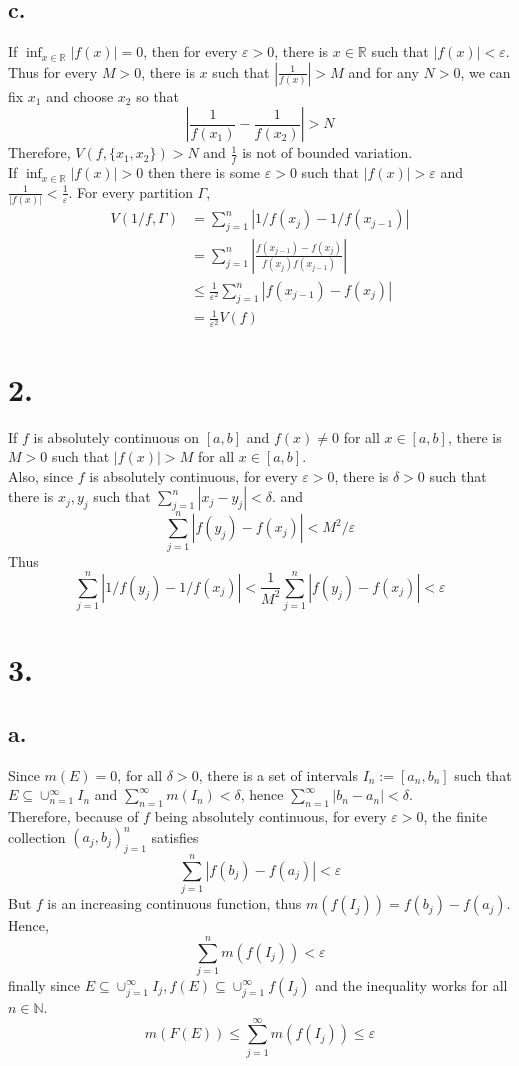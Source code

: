 \documentclass[11pt]{article}
\theoremstyle{mystyle}
\theoremstyle{definition}
\begin{document}
\subsection*{c.}
If $\inf_{x \in \mathbb{R}} |f(x)| = 0$, then for every $\varepsilon > 0$, there is $x \in \mathbb{R}$ such that $|f(x)| < \varepsilon$.  Thus for every $M > 0$, there is $x$ such that $|\frac{1}{f(x)}| > M $ and for any $N > 0$, we can fix $x_1$ and choose $x_2$ so that 
\[
  \left|\displaystyle\frac{1}{f(x_1)} - \displaystyle\frac{1}{f(x_2)}\right| > N  
\]
Therefore, $V(f, \{x_1, x_2\}) > N$ and $\displaystyle\frac{1}{f}$ is not of bounded variation. \\
If $\inf_{x \in \mathbb{R}} |f(x)| > 0$ then there is some $\varepsilon > 0$ such that $|f(x)| > \varepsilon$ and $\displaystyle\frac{1}{|f(x)|} < \displaystyle\frac{1}{\varepsilon}$. For every partition $\Gamma$,  
\begin{align*}
  V(1/f, \Gamma) &= \sum_{j=1}^n |1/f(x_j) - 1/f(x_{j-1}) | \\
  &= \sum_{j=1}^n \left| \displaystyle\frac{f(x_{j-1}) - f(x_j)}{f(x_j)f(x_{j-1})} \right| \\
  &\le \displaystyle\frac{1}{\varepsilon^2} \sum_{j=1}^n \left|f(x_{j-1}) -f(x_j) \right| \\
  &= \displaystyle\frac{1}{\varepsilon^2} V(f)
\end{align*}
\newpage
\section*{2.}
If $f$ is absolutely continuous on $[a,b]$ and $f(x) \ne 0$ for all $x \in [a,b]$, there is $M > 0$ such that $|f(x)| > M$ for all $x\in [a,b]$. \\
Also, since $f$ is absolutely continuous, for every $\varepsilon > 0$, there is $\delta > 0$ such that there is $x_j, y_j$ such that $\sum_{j=1}^n |x_j - y_j| < \delta$. 
and 
\[
  \sum_{j=1}^n |f(y_j) - f(x_j)| < M^2 / \varepsilon
\]
Thus
\[
  \sum_{j=1}^n |1/f(y_j) - 1/f(x_j)| < \displaystyle\frac{1}{M^2} \sum_{j=1}^n |f(y_j) - f(x_j)| < \varepsilon  
\]
\newpage 
\section*{3.}
\subsection*{a.}
Since $m(E) = 0$, for all $\delta > 0$, there is a set of intervals $I_n := [a_n, b_n]$ such that $E \subseteq \cup_{n=1}^\infty I_n$ and $\sum_{n=1}^\infty m(I_n) < \delta$, hence $\sum_{n=1}^\infty |b_n - a_n| < \delta$. \\
Therefore, because of $f$ being absolutely continuous, for every $\varepsilon > 0$, the finite collection $(a_j, b_j)_{j=1}^n$ satisfies 
\[
  \sum_{j=1}^n |f(b_j) - f(a_j)| < \varepsilon
\]
But $f$ is an increasing continuous function, thus $m(f(I_j)) = f(b_j) - f(a_j)$. Hence, 
\[
  \sum_{j=1}^n m(f(I_j)) < \varepsilon
\]
finally since $E \subseteq \cup_{j=1}^\infty I_j, f(E) \subseteq \cup_{j=1}^\infty f(I_j)$ and the inequality works for all $n \in \mathbb{N}$. 
\[
  m(F(E)) \le \sum_{j=1}^\infty m(f(I_j)) \le \varepsilon
\]
\end{document}
